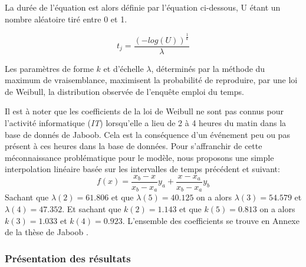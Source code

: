 La durée de l'équation est alors définie par l'équation ci-dessous, U étant un nombre aléatoire tiré entre 0 et 1. 

\begin{equation}
t_{j}=\frac{(-log(U))^{\frac{1}{k}}}{\lambda}
\end{equation}

Les paramètres de forme $k$ et d'échelle $\lambda$, déterminés par la méthode du maximum de vraisemblance, maximisent la probabilité de reproduire, par une loi de Weibull, la distribution observée de l'enquête emploi du temps.

Il est à noter que les coefficients de la loi de Weibull ne sont pas connus pour l'activité informatique (\textit{IT}) lorsqu'elle a lieu de 2 à 4 heures du matin dans la base de donnés de Jaboob. Cela est la conséquence d'un événement peu ou pas présent à ces heures dans la base de données. Pour s'affranchir de cette méconnaissance problématique pour le modèle, nous proposons une simple interpolation linéaire basée sur les intervalles de temps précédent et suivant:
\begin{equation}
f(x)=\frac{x_{b}-x}{x_{b}-x_{a}}y_{a}+\frac{x-x_{a}}{x_{b}-x_{a}}y_{b}
\end{equation}
Sachant que $\lambda(2)=61.806$ et que $\lambda(5)=40.125$ on a alors $\lambda(3)=54.579$ et $\lambda(4)=47.352$. Et sachant que $k(2)=1.143$ et que $k(5)=0.813$ on a alors $k(3)=1.033$ et $k(4)=0.923$. L'ensemble des coefficients se trouve en Annexe de la thèse de Jaboob \cite{Jaboob-16}.

\subsubsection{Présentation des résultats}

